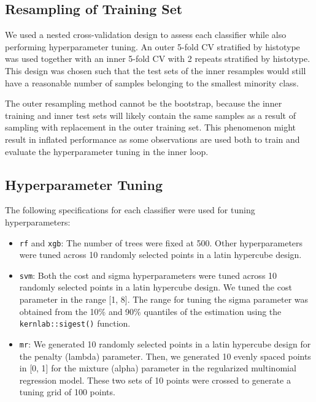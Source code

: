 \documentclass[
]{report}
\providecommand{\tightlist}{%
  \setlength{\itemsep}{0pt}\setlength{\parskip}{0pt}}
\begin{document}
\hypertarget{resampling-of-training-set}{%
\subsection{Resampling of Training Set}\label{resampling-of-training-set}}

We used a nested cross-validation design to assess each classifier while also performing hyperparameter tuning. An outer 5-fold CV stratified by histotype was used together with an inner 5-fold CV with 2 repeats stratified by histotype. This design was chosen such that the test sets of the inner resamples would still have a reasonable number of samples belonging to the smallest minority class.

The outer resampling method cannot be the bootstrap, because the inner training and inner test sets will likely contain the same samples as a result of sampling with replacement in the outer training set. This phenomenon might result in inflated performance as some observations are used both to train and evaluate the hyperparameter tuning in the inner loop.

\hypertarget{hyperparameter-tuning}{%
\subsection{Hyperparameter Tuning}\label{hyperparameter-tuning}}

The following specifications for each classifier were used for tuning hyperparameters:

\begin{itemize}
\tightlist
\item
  \texttt{rf} and \texttt{xgb}: The number of trees were fixed at 500. Other hyperparameters were tuned across 10 randomly selected points in a latin hypercube design.
\item
  \texttt{svm}: Both the cost and sigma hyperparameters were tuned across 10 randomly selected points in a latin hypercube design. We tuned the cost parameter in the range {[}1, 8{]}. The range for tuning the sigma parameter was obtained from the 10\% and 90\% quantiles of the estimation using the \texttt{kernlab::sigest()} function.
\item
  \texttt{mr}: We generated 10 randomly selected points in a latin hypercube design for the penalty (lambda) parameter. Then, we generated 10 evenly spaced points in {[}0, 1{]} for the mixture (alpha) parameter in the regularized multinomial regression model. These two sets of 10 points were crossed to generate a tuning grid of 100 points.
\end{itemize}
\end{document}
